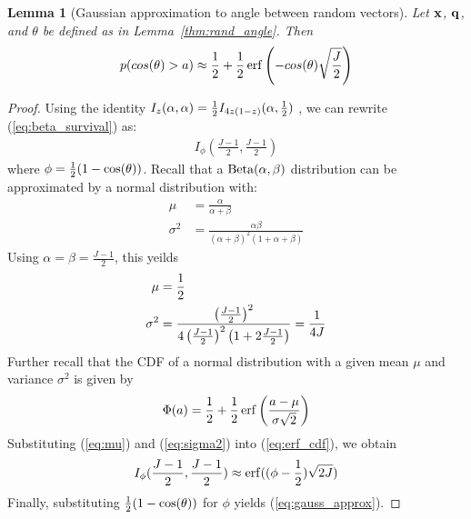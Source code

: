 \documentclass[]{article}
\newtheorem{lemma}{Lemma}[section]
\begin{document}


\begin{lemma}[Gaussian approximation to angle between random vectors]
Let $\mathbf{x}$, $\mathbf{q}$, and $\theta$ be defined as in Lemma~\ref{thm:rand_angle}. Then
\begin{align} \label{eq:gauss_approx}
    p(cos(\theta) > a) \approx \frac{1}{2} + \frac{1}{2} \operatorname{erf} \left( -cos(\theta)\sqrt{\frac{J}{2}} \right)
\end{align}
\end{lemma}

\begin{proof}
Using the identity $I_z(\alpha, \alpha) = \frac{1}{2} I_{4z(1-z)}(\alpha, \frac{1}{2})$ \cite[Eq.~8.17.6]{DLMF}, we can rewrite (\ref{eq:beta_survival}) as:
\begin{align}
    I_{\phi}(\frac{J-1}{2}, \frac{J-1}{2})
\end{align}
where $\phi = \frac{1}{2}(1 - \cos(\theta))$. Recall that a $\operatorname{Beta}(\alpha, \beta)$ distribution can be approximated by a normal distribution with:
\begin{align} \label{eq:normal_approx}
    \mu &= \frac{\alpha}{\alpha + \beta} \\
    \sigma^2 &= \frac{\alpha \beta}{(\alpha + \beta)^2(1 + \alpha + \beta)}
\end{align}
Using $\alpha = \beta = \frac{J-1}{2}$, this yeilds
\begin{align}
    \mu &= \frac{1}{2} \label{eq:mu} \\
    \sigma^2 &= \frac{ \left( \frac{J-1}{2} \right)^2 }{
        4 \left( \frac{J-1}{2} \right)^2 \left( 1 + 2\frac{J-1}{2} \right)
    }
    = \frac{1}{4J}  \label{eq:sigma2}
\end{align}
Further recall that the CDF of a normal distribution with a given mean $\mu$ and variance $\sigma^2$ is given by
\begin{align} \label{eq:erf_cdf}
    \Phi(a) = \frac{1}{2} + \frac{1}{2} \operatorname{erf} \left( \frac{a - \mu}{\sigma\sqrt{2}} \right)
\end{align}
Substituting (\ref{eq:mu}) and (\ref{eq:sigma2}) into (\ref{eq:erf_cdf}), we obtain
\begin{align}
    I_{\phi}(\frac{J-1}{2}, \frac{J-1}{2}) \approx \operatorname{erf}((\phi - \frac{1}{2})\sqrt{2J})
\end{align}
Finally, substituting $\frac{1}{2}(1 - \cos(\theta))$ for $\phi$ yields (\ref{eq:gauss_approx}).
\end{proof}
\end{document}
